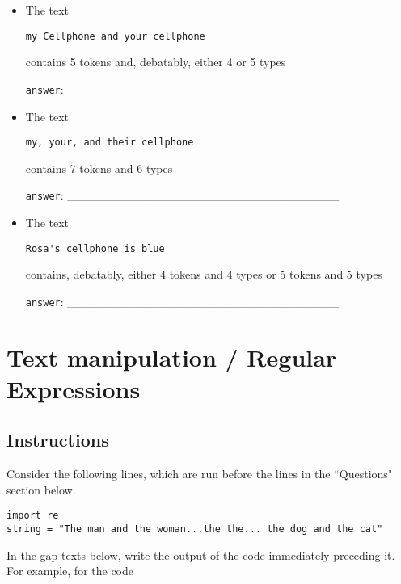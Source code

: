 \documentclass[a4paper,11pt]{scrartcl}
\begin{document}
\begin{itemize}
\singlespacing
\item The text
\begin{verbatim}
my Cellphone and your cellphone
\end{verbatim}
contains 5 tokens and, debatably, either 4 or 5 types

\verb|answer|: \_\_\_\_\_\_\_\_\_\_\_\_\_\_\_\_\_\_\_\_\_\_\_\_\_\_\_\_\_\_\_\_

\item The text
\begin{verbatim}
my, your, and their cellphone
\end{verbatim}
contains 7 tokens and 6 types

\verb|answer|: \_\_\_\_\_\_\_\_\_\_\_\_\_\_\_\_\_\_\_\_\_\_\_\_\_\_\_\_\_\_\_\_

\item The text
\begin{verbatim}
Rosa's cellphone is blue
\end{verbatim}
contains, debatably,
either 4 tokens and 4 types
or 5 tokens and 5 types

\verb|answer|: \_\_\_\_\_\_\_\_\_\_\_\_\_\_\_\_\_\_\_\_\_\_\_\_\_\_\_\_\_\_\_\_
\end{itemize}






\section{Text manipulation / Regular Expressions}

\subsection{Instructions}

Consider the following lines, which are run before the lines in the
``Questions" section below.

\begin{verbatim}
import re
string = "The man and the woman...the the... the dog and the cat"
\end{verbatim}

In the gap texts below, write the output of the code immediately preceding it.
For example, for the code
\end{document}
